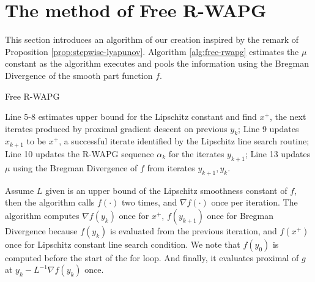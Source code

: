 \documentclass[12pt]{article}
\begin{document}
\section{The method of Free R-WAPG}\label{sec:free-rwapg}
    This section introduces an algorithm of our creation inspired by the remark of Proposition \ref{prop:stepwise-lyapunov}. 
    Algorithm \ref{alg:free-rwapg} estimates the $\mu$ constant as the algorithm executes and pools the information using the Bregman Divergence of the smooth part function $f$. 
    \begin{algorithm}
        \begin{algorithmic}[1]
        {\footnotesize
            \ENDWHILE
        \ENDFOR
        }
        \end{algorithmic}
        \caption{Free R-WAPG}
        \label{alg:free-rwapg}
    \end{algorithm}
    \par
    Line 5-8 estimates upper bound for the Lipschitz constant and find $x^+$, the next iterates produced by proximal gradient descent on previous $y_k$; 
    Line 9 updates $x_{k + 1}$ to be $x^+$, a successful iterate identified by the Lipschitz line search routine;
    Line 10 updates the R-WAPG sequence $\alpha_k$ for the iterates $y_{k + 1}$;
    Line 13 updates $\mu$ using the Bregman Divergence of $f$ from iterates $y_{k + 1}, y_k$. 
    \par
    Assume $L$ given is an upper bound of the Lipschitz smoothness constant of $f$, then the algorithm calls $f(\cdot)$ two times, and $\nabla f(\cdot)$ once per iteration. 
    The algorithm computes $\nabla f(y_k)$ once for $x^+$, $f(y_{k + 1})$ once for Bregman Divergence because $f(y_{k})$ is evaluated from the previous iteration, and $f(x^+)$ once for Lipschitz constant line search condition. 
    We note that $f(y_0)$ is computed before the start of the for loop. 
    And finally, it evaluates proximal of $g$ at $y_k - L^{-1}\nabla f(y_k)$ once. 
\end{document}
